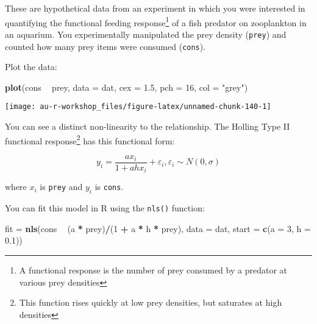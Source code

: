 \documentclass[]{book}
\newenvironment{Shaded}{\begin{snugshade}}{\end{snugshade}}
\newcommand{\KeywordTok}[1]{\textcolor[rgb]{0.13,0.29,0.53}{\textbf{#1}}}
\newcommand{\DataTypeTok}[1]{\textcolor[rgb]{0.13,0.29,0.53}{#1}}
\newcommand{\DecValTok}[1]{\textcolor[rgb]{0.00,0.00,0.81}{#1}}
\newcommand{\FloatTok}[1]{\textcolor[rgb]{0.00,0.00,0.81}{#1}}
\newcommand{\StringTok}[1]{\textcolor[rgb]{0.31,0.60,0.02}{#1}}
\newcommand{\OperatorTok}[1]{\textcolor[rgb]{0.81,0.36,0.00}{\textbf{#1}}}
\newcommand{\NormalTok}[1]{#1}
\let\rmarkdownfootnote\footnote%
\def\footnote{\protect\rmarkdownfootnote}
\theoremstyle{definition}
\theoremstyle{definition}
\theoremstyle{definition}
\theoremstyle{remark}
\begin{document}
These are hypothetical data from an experiment in which you were
interested in quantifying the functional feeding response\footnote{A
  functional response is the number of prey consumed by a predator at
  various prey densities} of a fish predator on zooplankton in an
aquarium. You experimentally manipulated the prey density
(\texttt{prey}) and counted how many prey items were consumed
(\texttt{cons}).

Plot the data:

\begin{Shaded}
\begin{Highlighting}[]
\KeywordTok{plot}\NormalTok{(cons }\OperatorTok{~}\StringTok{ }\NormalTok{prey, }\DataTypeTok{data =}\NormalTok{ dat, }\DataTypeTok{cex =} \FloatTok{1.5}\NormalTok{, }\DataTypeTok{pch =} \DecValTok{16}\NormalTok{, }\DataTypeTok{col =} \StringTok{"grey"}\NormalTok{)}
\end{Highlighting}
\end{Shaded}

\begin{center}\texttt{[image: au-r-workshop\_files/figure-latex/unnamed-chunk-140-1]} \end{center}

You can see a distinct non-linearity to the relationship. The Holling
Type II functional response\footnote{This function rises quickly at low
  prey densities, but saturates at high densities} has this functional
form:

\begin{equation}
  y_i=\frac{ax_i}{1+ahx_i} + \varepsilon_i, \varepsilon_i \sim N(0, \sigma)
\label{eq:func-resp}
\end{equation}

where \(x_i\) is \texttt{prey} and \(y_i\) is \texttt{cons}.

You can fit this model in R using the \texttt{nls()} function:

\begin{Shaded}
\begin{Highlighting}[]
\NormalTok{fit =}\StringTok{ }\KeywordTok{nls}\NormalTok{(cons }\OperatorTok{~}\StringTok{ }\NormalTok{(a }\OperatorTok{*}\StringTok{ }\NormalTok{prey)}\OperatorTok{/}\NormalTok{(}\DecValTok{1} \OperatorTok{+}\StringTok{ }\NormalTok{a }\OperatorTok{*}\StringTok{ }\NormalTok{h }\OperatorTok{*}\StringTok{ }\NormalTok{prey), }\DataTypeTok{data =}\NormalTok{ dat,}
          \DataTypeTok{start =} \KeywordTok{c}\NormalTok{(}\DataTypeTok{a =} \DecValTok{3}\NormalTok{, }\DataTypeTok{h =} \FloatTok{0.1}\NormalTok{))}
\end{Highlighting}
\end{Shaded}
\end{document}
